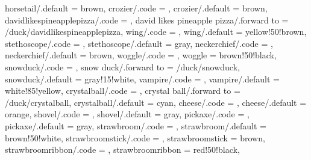 {  horsetail/.default        = brown,
  crozier/.code             = \duck@croziertrue     
                              \def\duck@crozier{#1},
  crozier/.default          = brown,
  davidlikespineapplepizza/.code = \duck@davidlikespineapplepizzatrue
                              \duck@speechtrue 
  \def\duck@speech{\scalebox{\scalingfactor}{\scalebox{0.9}{\tiny ih, che schifo!}}},
  david likes pineapple pizza/.forward to = /duck/davidlikespineapplepizza,
  wing/.code                = \duck@wingtrue      
                              \def\duck@wing{#1},
  wing/.default             = yellow!50!brown,
  stethoscope/.code         = \duck@stethoscopetrue 
                              \def\duck@stethoscope{#1},
  stethoscope/.default      = gray,
  neckerchief/.code         = \duck@neckerchieftrue 
                              \def\duck@neckerchief{#1},
  neckerchief/.default      = brown,
  woggle/.code              = \def\duck@woggle{#1},
  woggle                    = brown!50!black,
  snowduck/.code            = \duck@snowducktrue 
                              \def\duck@snowduck{#1}
                              \def\duck@eye{#1}
                              \def\duck@body{#1}
                              \duck@tophattrue
                              \def\duck@tophat{black}
                              \duck@buttonstrue  
                              \def\duck@buttons{black},
  snow duck/.forward to     = /duck/snowduck,
  snowduck/.default         = gray!15!white,
  vampire/.code             = \duck@vampiretrue  
                              \def\duck@vampire{#1},
  vampire/.default          = white!85!yellow,
  crystalball/.code         = \duck@crystalballtrue 
                              \def\duck@crystalball{#1},
  crystal ball/.forward to  = /duck/crystalball,
  crystalball/.default      = cyan,
  cheese/.code              = \duck@cheesetrue
                              \def\duck@cheese{#1},
  cheese/.default           = orange,  
  shovel/.code              = \duck@shoveltrue
                              \def\duck@shovel{#1},
  shovel/.default           = gray,    
  pickaxe/.code             = \duck@pickaxetrue
                              \def\duck@pickaxe{#1},
  pickaxe/.default          = gray, 
  strawbroom/.code          = \duck@strawbroomtrue
                              \def\duck@strawbroom{#1},
  strawbroom/.default       = brown!50!white,
  strawbroomstick/.code     = \def\duck@strawbroomstick{#1},
  strawbroomstick           = brown,
  strawbroomribbon/.code    = \def\duck@strawbroomribbon{#1},
  strawbroomribbon          = red!50!black,
}
